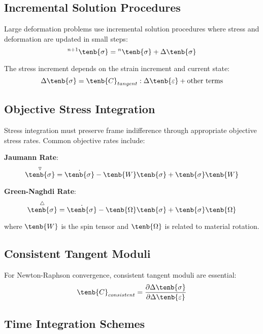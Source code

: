 \subsection{Incremental Solution Procedures}

Large deformation problems use incremental solution procedures where stress and deformation are updated in small steps:
\begin{equation}
{}^{n+1}\tenb{\sigma} = {}^n\tenb{\sigma} + \Delta\tenb{\sigma}
\end{equation}

The stress increment depends on the strain increment and current state:
\begin{equation}
\Delta\tenb{\sigma} = \tenb{C}_{tangent} : \Delta\tenb{\varepsilon} + \text{other terms}
\end{equation}

\subsection{Objective Stress Integration}

Stress integration must preserve frame indifference through appropriate objective stress rates. Common objective rates include:

\textbf{Jaumann Rate}:
\begin{equation}
\overset{\triangledown}{\tenb{\sigma}} = \dot{\tenb{\sigma}} - \tenb{W}\tenb{\sigma} + \tenb{\sigma}\tenb{W}
\end{equation}

\textbf{Green-Naghdi Rate}:
\begin{equation}
\overset{\triangle}{\tenb{\sigma}} = \dot{\tenb{\sigma}} - \tenb{\Omega}\tenb{\sigma} + \tenb{\sigma}\tenb{\Omega}
\end{equation}

where $\tenb{W}$ is the spin tensor and $\tenb{\Omega}$ is related to material rotation.

\subsection{Consistent Tangent Moduli}

For Newton-Raphson convergence, consistent tangent moduli are essential:
\begin{equation}
\tenb{C}_{consistent} = \frac{\partial \Delta\tenb{\sigma}}{\partial \Delta\tenb{\varepsilon}}
\end{equation}

\subsection{Time Integration Schemes}

